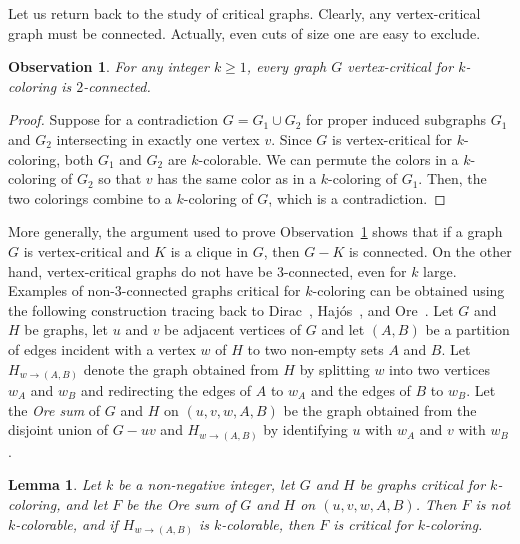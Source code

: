 \documentclass[12pt,twoside,openright,a4paper]{book}
\newtheorem{lemma}[theorem]{Lemma}
\newtheorem{observation}[theorem]{Observation}
\begin{document}
Let us return back to the study of critical graphs.  Clearly, any vertex-critical graph must be connected.  Actually, even cuts of size one are easy to exclude.
\begin{observation}\label{obs:crit-2conn}
For any integer $k\ge 1$, every graph $G$ vertex-critical for $k$-coloring is $2$-connected.
\end{observation}
\begin{proof}
Suppose for a contradiction $G=G_1\cup G_2$ for proper induced subgraphs $G_1$ and $G_2$ intersecting in exactly one vertex $v$.
Since $G$ is vertex-critical for $k$-coloring, both $G_1$ and $G_2$ are $k$-colorable.  We can permute the colors in a $k$-coloring of $G_2$
so that $v$ has the same color as in a $k$-coloring of $G_1$.  Then, the two colorings combine to a $k$-coloring of $G$, which is a contradiction.
\end{proof}
More generally, the argument used to prove Observation~\ref{obs:crit-2conn} shows that if a graph $G$ is vertex-critical and $K$ is a clique
in $G$, then $G-K$ is connected.
On the other hand, vertex-critical graphs do not have be $3$-connected, even for $k$ large.  Examples of non-$3$-connected graphs critical for $k$-coloring can
be obtained using the following construction tracing back to Dirac~\cite{dircrit}, Haj\'os~\cite{hajos}, and Ore~\cite{ore}.  Let $G$ and $H$ be graphs,
let $u$ and $v$ be adjacent vertices of $G$ and let $(A,B)$ be a partition of edges incident with a vertex $w$ of $H$ to two non-empty sets $A$ and $B$.
Let $H_{w\to(A,B)}$ denote the graph obtained from $H$ by splitting $w$ into two vertices $w_A$ and $w_B$ and redirecting the edges of $A$ to $w_A$
and the edges of $B$ to $w_B$.  Let the \emph{Ore sum} of $G$ and $H$ on $(u,v,w,A,B)$ be the graph obtained from the disjoint union
of $G-uv$ and $H_{w\to(A,B)}$ by identifying $u$ with $w_A$ and $v$ with $w_B$.
\begin{lemma}\label{lemma-orecrit}
Let $k$ be a non-negative integer, let $G$ and $H$ be graphs critical for $k$-coloring, and let $F$ be the Ore sum of $G$ and $H$ on $(u,v,w,A,B)$.
Then $F$ is not $k$-colorable, and if $H_{w\to(A,B)}$ is $k$-colorable, then $F$ is critical for $k$-coloring.
\end{lemma}
\end{document}
